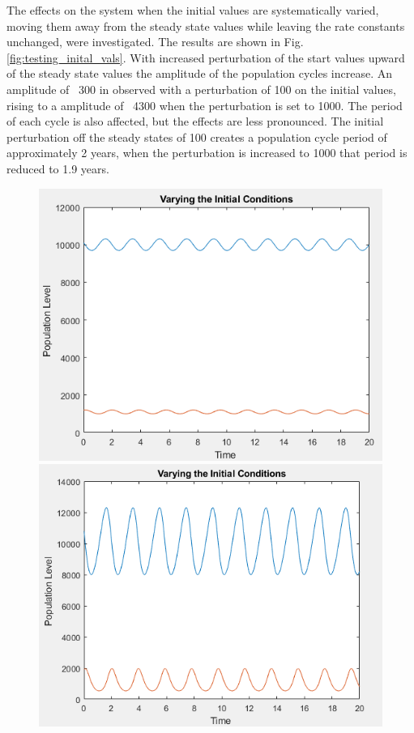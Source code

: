 \documentclass{article}
\begin{document}
The effects on the system when the initial values are systematically varied, moving them away from the steady state values while leaving the rate constants unchanged, were investigated. The results are shown in Fig. \ref{fig:testing_inital_vals}. With increased perturbation of the start values upward of the steady state values the amplitude of the population cycles increase. An amplitude of ~300 in observed with a perturbation of 100 on the initial values, rising to a amplitude of ~4300 when the perturbation is set to 1000.
The period of each cycle is also affected, but the effects are less pronounced. The initial perturbation off the steady states of 100 creates a population cycle period of approximately 2 years, when the perturbation is increased to 1000 that period is reduced to 1.9 years. 

\begin{figure}[H]
    \includegraphics[scale = 0.74]{initial_perb_small.PNG}
    \includegraphics[scale = 0.712]{initial_perb_big.PNG}

\end{figure}
\end{document}
